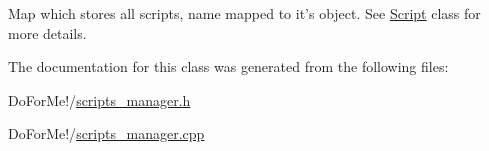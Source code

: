 Map which stores all scripts, name mapped to it's object. See \hyperlink{class_script}{Script} class for more details. 



The documentation for this class was generated from the following files\-:\begin{DoxyCompactItemize}
\item 
Do\-For\-Me!/\hyperlink{scripts__manager_8h}{scripts\-\_\-manager.\-h}\item 
Do\-For\-Me!/\hyperlink{scripts__manager_8cpp}{scripts\-\_\-manager.\-cpp}\end{DoxyCompactItemize}
